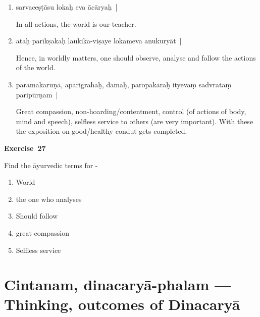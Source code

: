 \begin{enumerate}
\itemsep=0pt
\item {}

sarvaceṣṭāsu lokaḥ eva ācāryaḥ~|

In all actions, the world is our teacher.

\item {}

ataḥ parīkṣakaḥ laukika-viṣaye lokameva anukuryāt~|

Hence, in worldly matters,  one should observe, analyse and follow the actions of the world. 

\item {}

paramakaruṇā, aparigrahaḥ, damaḥ, paropakāraḥ ityevaṃ sadvrataṃ paripūrṇam~| 

Great compassion, non-hoarding/contentment, control (of actions of body, mind and speech), selfless service to others (are very important). With these the exposition on good/healthy condut gets completed.
\end{enumerate}

\centerline{\textbf{Exercise~27}}

Find the āyurvedic terms for -

\begin{enumerate}
\itemsep=0pt
\renewcommand{\theenumi}{\alph{enumi}}
\renewcommand{\labelenumi}{\theenumi.}
\item World
\item the one who analyses
\item Should follow
\item great compassion
\item Selfless service
\end{enumerate}

\chapter{Cintanam, dinacaryā-phalam --- Thinking, outcomes of Dinacaryā}

